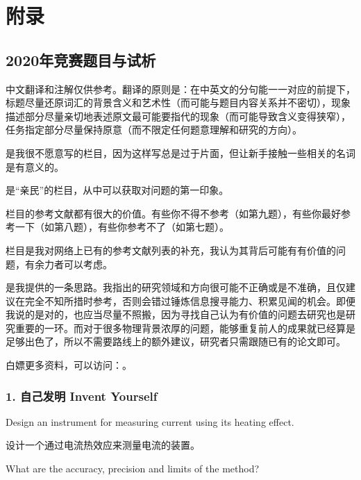 \documentclass[a4paper,10pt,english]{sphinxmanual}
\begin{document}


\chapter{附录}
\label{\detokenize{8. Appendix:id1}}\label{\detokenize{8. Appendix::doc}}

\section{2020年竞赛题目与试析}
\label{\detokenize{8. Appendix:id2}}
中文翻译和注解仅供参考。翻译的原则是：在中英文的分句能一一对应的前提下，标题尽量还原词汇的背景含义和艺术性（而可能与题目内容关系并不密切），现象描述部分尽量亲切地表述原文最可能要指代的现象（而可能导致含义变得狭窄），任务指定部分尽量保持原意（而不限定任何题意理解和研究的方向）。

 是我很不愿意写的栏目，因为这样写总是过于片面，但让新手接触一些相关的名词是有意义的。

 是“亲民”的栏目，从中可以获取对问题的第一印象。

 栏目的参考文献都有很大的价值。有些你不得不参考（如第九题），有些你最好参考一下（如第八题），有些你参考不了（如第七题）。

 栏目是我对网络上已有的参考文献列表的补充，我认为其背后可能有有价值的问题，有余力者可以考虑。

 是我提供的一条思路。我指出的研究领域和方向很可能不正确或是不准确，且仅建议在完全不知所措时参考，否则会错过锤炼信息搜寻能力、积累见闻的机会。即便我说的是对的，也应当尽量不照搬，因为寻找自己认为有价值的问题去研究也是研究重要的一环。而对于很多物理背景浓厚的问题，能够重复前人的成果就已经算是足够出色了，所以不需要路线上的额外建议，研究者只需跟随已有的论文即可。

白嫖更多资料，可以访问：。


\subsection{1. 自己发明 Invent Yourself}
\label{\detokenize{8. Appendix:invent-yourself}}
Design an instrument for measuring current using its heating effect.

设计一个通过电流热效应来测量电流的装置。

What are the accuracy, precision and limits of the method?
\end{document}
